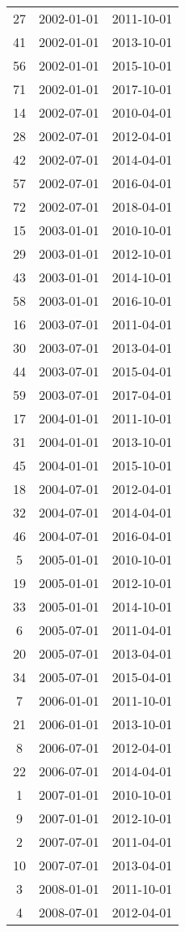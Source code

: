 \begin{tabular}{ccc}
  27 & 2002-01-01 & 2011-10-01 \\ 
  41 & 2002-01-01 & 2013-10-01 \\ 
  56 & 2002-01-01 & 2015-10-01 \\ 
  71 & 2002-01-01 & 2017-10-01 \\ 
  14 & 2002-07-01 & 2010-04-01 \\ 
  28 & 2002-07-01 & 2012-04-01 \\ 
  42 & 2002-07-01 & 2014-04-01 \\ 
  57 & 2002-07-01 & 2016-04-01 \\ 
  72 & 2002-07-01 & 2018-04-01 \\ 
  15 & 2003-01-01 & 2010-10-01 \\ 
  29 & 2003-01-01 & 2012-10-01 \\ 
  43 & 2003-01-01 & 2014-10-01 \\ 
  58 & 2003-01-01 & 2016-10-01 \\ 
  16 & 2003-07-01 & 2011-04-01 \\ 
  30 & 2003-07-01 & 2013-04-01 \\ 
  44 & 2003-07-01 & 2015-04-01 \\ 
  59 & 2003-07-01 & 2017-04-01 \\ 
  17 & 2004-01-01 & 2011-10-01 \\ 
  31 & 2004-01-01 & 2013-10-01 \\ 
  45 & 2004-01-01 & 2015-10-01 \\ 
  18 & 2004-07-01 & 2012-04-01 \\ 
  32 & 2004-07-01 & 2014-04-01 \\ 
  46 & 2004-07-01 & 2016-04-01 \\ 
  5 & 2005-01-01 & 2010-10-01 \\ 
  19 & 2005-01-01 & 2012-10-01 \\ 
  33 & 2005-01-01 & 2014-10-01 \\ 
  6 & 2005-07-01 & 2011-04-01 \\ 
  20 & 2005-07-01 & 2013-04-01 \\ 
  34 & 2005-07-01 & 2015-04-01 \\ 
  7 & 2006-01-01 & 2011-10-01 \\ 
  21 & 2006-01-01 & 2013-10-01 \\ 
  8 & 2006-07-01 & 2012-04-01 \\ 
  22 & 2006-07-01 & 2014-04-01 \\ 
  1 & 2007-01-01 & 2010-10-01 \\ 
  9 & 2007-01-01 & 2012-10-01 \\ 
  2 & 2007-07-01 & 2011-04-01 \\ 
  10 & 2007-07-01 & 2013-04-01 \\ 
  3 & 2008-01-01 & 2011-10-01 \\ 
  4 & 2008-07-01 & 2012-04-01 \\ 
   \hline
\end{tabular}
